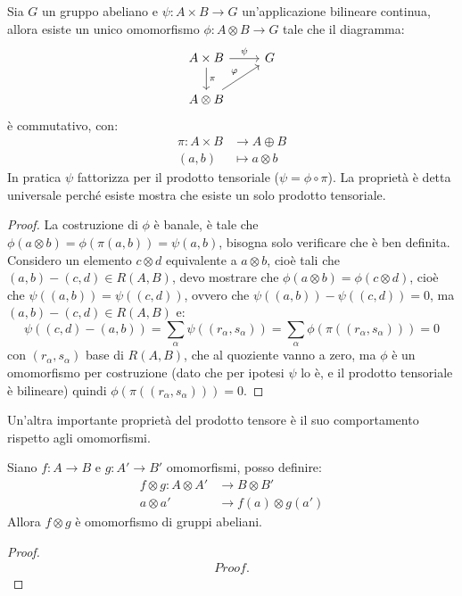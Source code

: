 \begin{proposition}
  Sia $ G $ un gruppo abeliano e $ \psi \colon A \times B \to G $ un'applicazione bilineare continua,
  allora esiste un unico omomorfismo $ \phi \colon A \otimes B \to G $ tale che il diagramma:
  \[
    \begin{tikzcd}
      A \times B \rar{\psi} \dar{\pi} & G \\
      A \otimes B \arrow{ru}{\phi} & {}
    \end{tikzcd}
  \]
  è commutativo, con:
  \begin{align*}
    \pi \colon A \times B & \to A \oplus B \\
    (a,b) & \mapsto a \otimes b
  \end{align*}
  In pratica $ \psi $ fattorizza per il prodotto tensoriale
  ($ \psi = \phi \circ \pi $). La proprietà è detta universale perché esiste mostra che
  esiste un solo prodotto tensoriale.
\end{proposition}
\begin{proof}
  La costruzione di $ \phi $ è banale, è tale che $ \phi(a \otimes b) = \phi(\pi(a,b)) = \psi(a,b) $,
  bisogna solo verificare che è ben definita.
  Considero un elemento $ c \otimes d $ equivalente a $ a \otimes b $, cioè tali
  che $ (a,b) - (c,d) \in R(A,B) $, devo mostrare che $ \phi(a \otimes b) = \phi(c \otimes d) $,
  cioè che $ \psi((a,b)) = \psi((c,d)) $, ovvero che $ \psi((a,b)) - \psi((c,d)) = 0 $, ma
  $ (a,b) - (c,d) \in R(A,B) $ e:
  \[
    \psi((c,d) - (a,b)) = \sum_\alpha \psi((r_\alpha, s_\alpha)) = \sum_\alpha \phi \left(\pi((r_\alpha, s_\alpha))\right) = 0
  \]
  con $ (r_\alpha,s_\alpha) $ base di $ R(A,B) $, che al quoziente vanno a zero, ma
  $ \phi $ è un omomorfismo per costruzione (dato che per ipotesi $ \psi $ lo è, e il
  prodotto tensoriale è bilineare) quindi $ \phi(\pi((r_\alpha, s_\alpha))) = 0 $.
\end{proof}

Un'altra importante proprietà del prodotto tensore è il suo comportamento
rispetto agli omomorfismi.

\begin{proposition}
  Siano $ f \colon A \to B $ e $ g \colon A' \to B' $ omomorfismi, posso definire:
  \begin{align*}
    f \otimes g \colon A \otimes A' & \to B \otimes B' \\
    a \otimes a' & \to f(a) \otimes g(a')
  \end{align*}
  Allora $ f \otimes g $ è omomorfismo di gruppi abeliani.
\end{proposition}
\begin{proof}
  \begin{gather*}
    Proof.
  \end{gather*}
\end{proof}

